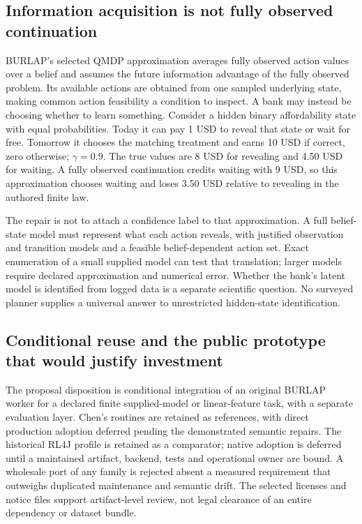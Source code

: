 \subsection{Information acquisition is not fully observed continuation}
BURLAP's selected QMDP approximation averages fully observed action values over a belief and assumes the future information advantage of the fully observed problem. Its available actions are obtained from one sampled underlying state, making common action feasibility a condition to inspect. A bank may instead be choosing whether to learn something. Consider a hidden binary affordability state with equal probabilities. Today it can pay 1 USD to reveal that state or wait for free. Tomorrow it chooses the matching treatment and earns 10 USD if correct, zero otherwise; $\gamma=0.9$. The true values are 8 USD for revealing and 4.50 USD for waiting. A fully observed continuation credits waiting with 9 USD, so this approximation chooses waiting and loses 3.50 USD relative to revealing in the authored finite law.\citep{exec24_policyjava_burlap,exec24_policyjava_comparison}

The repair is not to attach a confidence label to that approximation. A full belief-state model must represent what each action reveals, with justified observation and transition models and a feasible belief-dependent action set. Exact enumeration of a small supplied model can test that translation; larger models require declared approximation and numerical error. Whether the bank's latent model is identified from logged data is a separate scientific question. No surveyed planner supplies a universal answer to unrestricted hidden-state identification.

\subsection{Conditional reuse and the public prototype that would justify investment}
The proposal disposition is conditional integration of an original BURLAP worker for a declared finite supplied-model or linear-feature task, with a separate evaluation layer. Chen's routines are retained as references, with direct production adoption deferred pending the demonstrated semantic repairs. The historical RL4J profile is retained as a comparator; native adoption is deferred until a maintained artifact, backend, tests and operational owner are bound. A wholesale port of any family is rejected absent a measured requirement that outweighs duplicated maintenance and semantic drift. The selected licenses and notice files support artifact-level review, not legal clearance of an entire dependency or dataset bundle.\citep{exec24_policyjava_comparison}

